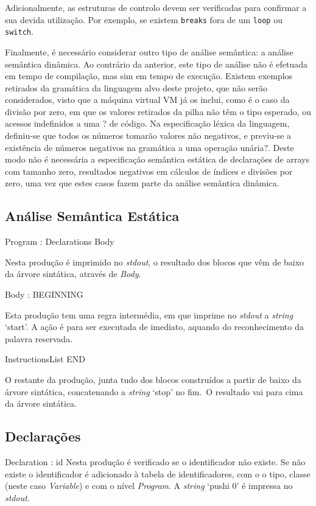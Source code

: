 Adicionalmente, as estruturas de controlo devem ser verificadas para confirmar
a sua devida utilização.  Por exemplo, se existem \texttt{breaks} fora de um
\texttt{loop} ou \texttt{switch}. 

Finalmente, é necessário considerar outro tipo de análise semântica: a análise
semântica dinâmica.  Ao contrário da anterior, este tipo de análise não
é efetuada em tempo de compilação, mas sim em tempo de execução. Existem
exemplos retirados da gramática da linguagem alvo deste projeto, que não serão
considerados, visto que a máquina virtual VM já os inclui, como é o caso da
divisão por zero, em que os valores retirados da pilha não têm o tipo esperado,
ou acessos indefinidos a uma ? de código. Na especificação léxica da
linguagem, definiu-se que todos os números tomarão valores não negativos,
e previu-se a existência de números negativos na gramática  a uma operação
unária?.  Deste modo não é necessária a especificação semântica estática de
declarações de arrays com tamanho zero, resultados negativos em cálculos de
índices e divisões por zero, uma vez que estes casos fazem parte da análise
semântica dinâmica.



\subsection{Análise Semântica Estática}
\label{subsec:semantica:desenho}


Program : Declarations Body   

Nesta produção é imprimido no \emph{stdout}, o resultado dos blocos que vêm de
baixo  da árvore sintática, através de \emph{Body}. 



Body : BEGINNING 

Esta produção tem uma regra intermédia, em que imprime no \emph{stdout}
a \emph{string} `start'. A ação é para ser executada de imediato, aquando do
reconhecimento da palavra reservada.


InstructionsList END      

O restante da produção, junta tudo dos blocos construídos a partir de baixo da
árvore sintática, concatenando a \emph{string} `stop' no fim.\ O resultado vai
para cima da árvore sintática.


\subsection{Declarações}
Declaration : id              
Nesta produção é verificado se o identificador não existe. Se não existe
o identificador é adicionado à tabela de identificadores, com o o tipo, classe
(neste caso \emph{Variable}) e com o nível \emph{Program}. A \emph{string}
`pushi 0' é impressa no \emph{stdout}.   



